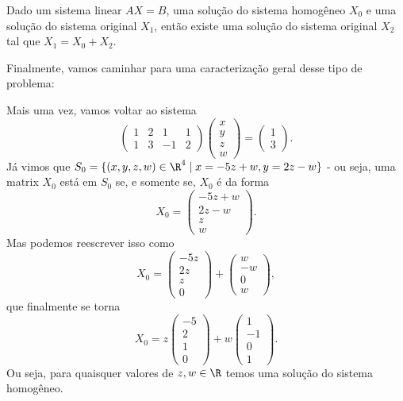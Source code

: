 \begin{prop}
	Dado um sistema linear $AX=B$, uma solução do sistema homogêneo $X_0$ e uma solução do sistema original $X_1$, então existe uma solução do sistema original $X_2$ tal que $X_1=X_0+X_2$.
\end{prop}

Finalmente, vamos caminhar para uma caracterização geral desse tipo de problema:

\begin{ex}
	Mais uma vez, vamos voltar ao sistema 
	\[\begin{pmatrix}
	1 & 2 & 1 & 1\\1&3&-1&2
	\end{pmatrix}\begin{pmatrix}
	x\\y\\z\\w
	\end{pmatrix}=\begin{pmatrix}
	1\\3
	\end{pmatrix}.\] Já vimos que $S_0=\{(x,y,z,w)\in\R^4\mid x=-5z+w,y=2z-w\}$ - ou seja, uma matrix $X_0$ está em $S_0$ se, e somente se, $X_0$ é da forma
	\[X_0=\begin{pmatrix}
	-5z+w\\2z-w\\z\\w
	\end{pmatrix}.\] Mas podemos reescrever isso como
	\[X_0=\begin{pmatrix}
	-5z\\2z\\z\\0
	\end{pmatrix}+\begin{pmatrix}
	w\\-w\\0\\w
	\end{pmatrix},\] que finalmente se torna
	\[X_0=z\begin{pmatrix}
	-5\\2\\1\\0
	\end{pmatrix}+w\begin{pmatrix}
	1\\-1\\0\\1
	\end{pmatrix}.\]Ou seja, para quaisquer valores de $z,w\in \R$ temos uma solução do sistema homogêneo.
	

\end{ex}
